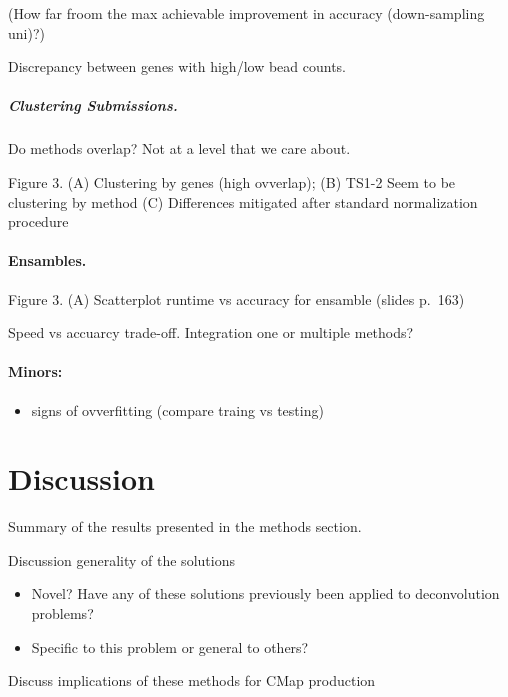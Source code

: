 \documentclass[]{article}
\providecommand{\tightlist}{%
  \setlength{\itemsep}{0pt}\setlength{\parskip}{0pt}}
\let\oldparagraph\paragraph
\renewcommand{\paragraph}[1]{\oldparagraph{#1}\mbox{}}
\let\oldsubparagraph\subparagraph
\renewcommand{\subparagraph}[1]{\oldsubparagraph{#1}\mbox{}}
\begin{document}
(How far froom the max achievable improvement in accuracy (down-sampling
uni)?)

Discrepancy between genes with high/low bead counts.

\hypertarget{clustering-submissions.}{%
\subparagraph{Clustering Submissions.}\label{clustering-submissions.}}

Do methods overlap? Not at a level that we care about.

Figure 3. (A) Clustering by genes (high ovverlap); (B) TS1-2 Seem to be
clustering by method (C) Differences mitigated after standard
normalization procedure

\hypertarget{ensambles.}{%
\paragraph{Ensambles.}\label{ensambles.}}

Figure 3. (A) Scatterplot runtime vs accuracy for ensamble (slides
p.~163)

Speed vs accuarcy trade-off. Integration one or multiple methods?

\hypertarget{minors}{%
\paragraph{Minors:}\label{minors}}

\begin{itemize}
\tightlist
\item
  signs of ovverfitting (compare traing vs testing)
\end{itemize}

\hypertarget{discussion}{%
\section{Discussion}\label{discussion}}

Summary of the results presented in the methods section.

Discussion generality of the solutions

\begin{itemize}
\tightlist
\item
  Novel? Have any of these solutions previously been applied to
  deconvolution problems?
\item
  Specific to this problem or general to others?
\end{itemize}

Discuss implications of these methods for CMap production
\end{document}
